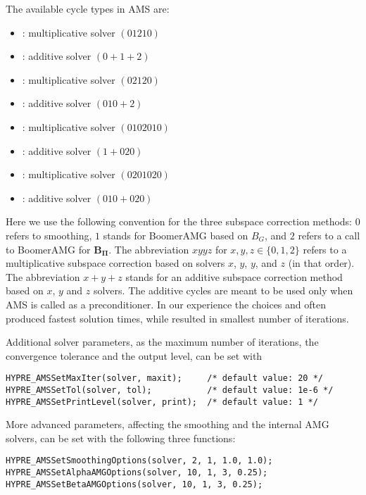 \noindent
The available cycle types in AMS are:
\begin{itemize}
\item {}: multiplicative solver $(01210)$
\item {}: additive solver $(0+1+2)$
\item {}: multiplicative solver $(02120)$
\item {}: additive solver $(010+2)$
\item {}: multiplicative solver $(0102010)$
\item {}: additive solver $(1+020)$
\item {}: multiplicative solver $(0201020)$
\item {}: additive solver $(010+020)$
\end{itemize}
Here we use the following convention for the
three subspace correction methods:
$0$ refers to smoothing, $1$ stands for BoomerAMG based on $B_G$, and
$2$ refers to a call to BoomerAMG for ${\mathbf B}_{{\mathbf \Pi}}$.
The abbreviation $xyyz$  for $x,y,z \in \{0,1,2\}$
refers to a multiplicative subspace correction based on solvers $x$, $y$, $y$, and $z$ (in that order).
The abbreviation $x+y+z$ stands for an additive subspace correction method
based on $x$, $y$ and $z$ solvers.
The additive cycles are meant to be used only when AMS is called
as a preconditioner.
In our experience the choices  and  often produced
fastest solution times, while  resulted in smallest
number of iterations.

Additional solver parameters, as the maximum number of iterations,
the convergence tolerance and the output level, can be set with
\begin{display}\begin{verbatim}
HYPRE_AMSSetMaxIter(solver, maxit);     /* default value: 20 */
HYPRE_AMSSetTol(solver, tol);           /* default value: 1e-6 */
HYPRE_AMSSetPrintLevel(solver, print);  /* default value: 1 */
\end{verbatim}\end{display}

More advanced parameters, affecting the smoothing and the
internal AMG solvers, can be set with the following three
functions:
\begin{display}\begin{verbatim}
HYPRE_AMSSetSmoothingOptions(solver, 2, 1, 1.0, 1.0);
HYPRE_AMSSetAlphaAMGOptions(solver, 10, 1, 3, 0.25);
HYPRE_AMSSetBetaAMGOptions(solver, 10, 1, 3, 0.25);
\end{verbatim}\end{display}

